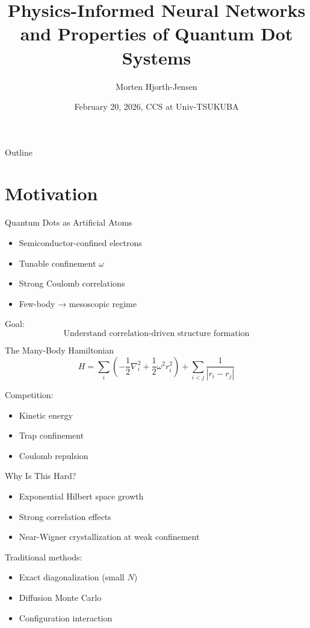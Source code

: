 \documentclass{beamer}
\title{Physics-Informed Neural Networks \\ and Properties of Quantum Dot Systems}
\author{Morten Hjorth-Jensen}
\institute{University of Oslo}
\date{February 20, 2026, CCS at Univ-TSUKUBA}
\begin{document}
\begin{frame}
\titlepage
\end{frame}

\begin{frame}{Outline}
\tableofcontents
\end{frame}

\section{Motivation}

\begin{frame}{Quantum Dots as Artificial Atoms}
\begin{itemize}
\item Semiconductor-confined electrons
\item Tunable confinement $\omega$
\item Strong Coulomb correlations
\item Few-body → mesoscopic regime
\end{itemize}

\vspace{0.3cm}
Goal:
\[
\text{Understand correlation-driven structure formation}
\]
\end{frame}

\begin{frame}{The Many-Body Hamiltonian}
\[
H =
\sum_i
\left(
-\frac{1}{2}\nabla_i^2
+
\frac{1}{2}\omega^2 r_i^2
\right)
+
\sum_{i<j}\frac{1}{|r_i-r_j|}
\]

Competition:
\begin{itemize}
\item Kinetic energy
\item Trap confinement
\item Coulomb repulsion
\end{itemize}
\end{frame}

\begin{frame}{Why Is This Hard?}
\begin{itemize}
\item Exponential Hilbert space growth
\item Strong correlation effects
\item Near-Wigner crystallization at weak confinement
\end{itemize}

Traditional methods:
\begin{itemize}
\item Exact diagonalization (small $N$)
\item Diffusion Monte Carlo
\item Configuration interaction
\end{itemize}
\end{frame}
\end{document}
